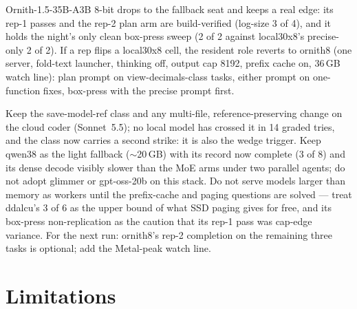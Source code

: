 Ornith-1.5-35B-A3B 8-bit drops to the fallback seat and keeps a real edge: its rep-1 passes and the rep-2 plan
arm are build-verified (log-size 3 of 4), and it holds the night's only clean box-press sweep (2 of 2 against
local30x8's precise-only 2 of 2). If a rep flips a local30x8 cell, the resident role reverts to
ornith8 (one server, fold-text launcher, thinking off, output cap 8192, prefix cache on, 36\,GB watch line):
plan prompt on view-decimals-class tasks, either prompt on one-function fixes, box-press with the precise
prompt first.

Keep the save-model-ref class and any multi-file, reference-preserving change on the cloud coder (Sonnet~5.5);
no local model has crossed it in 14 graded tries, and the class now carries a second strike: it is also the
wedge trigger. Keep qwen38 as the light fallback (${\sim}$20\,GB) with its record now complete (3 of 8) and its
dense decode visibly slower than the MoE arms under two parallel agents; do not adopt glimmer or gpt-oss-20b on
this stack. Do not serve models larger than memory as workers until the prefix-cache and paging questions are
solved --- treat ddalcu's 3 of 6 as the upper bound of what SSD paging gives for free, and its box-press
non-replication as the caution that its rep-1 pass was cap-edge variance. For the next run: ornith8's rep-2
completion on the remaining three tasks is optional; add the Metal-peak watch line.

\section{Limitations}\label{sec:limits}

